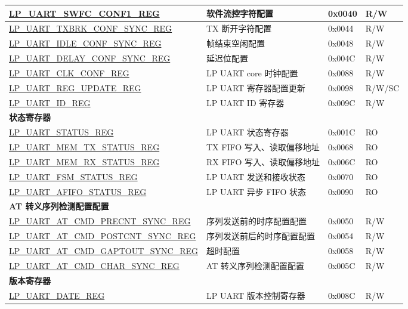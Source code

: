 \begin{longtable}{ | p{6.5cm} | p{7cm} | p{1.3cm} | p{1cm} | }
\hyperref[regdesc:LPUARTSWFCCONF1REG]{LP\_UART\_SWFC\_CONF1\_REG} & 软件流控字符配置 & 0x0040 & R/W \\ \hline
\hyperref[regdesc:LPUARTTXBRKCONFSYNCREG]{LP\_UART\_TXBRK\_CONF\_SYNC\_REG} & TX 断开字符配置 & 0x0044 & R/W \\ \hline
\hyperref[regdesc:LPUARTIDLECONFSYNCREG]{LP\_UART\_IDLE\_CONF\_SYNC\_REG} & 帧结束空闲配置 & 0x0048 & R/W \\ \hline
\hyperref[regdesc:LPUARTDELAYCONFSYNCREG]{LP\_UART\_DELAY\_CONF\_SYNC\_REG} & 延迟位配置 & 0x004C & R/W \\ \hline
\hyperref[regdesc:LPUARTCLKCONFREG]{LP\_UART\_CLK\_CONF\_REG} & LP UART core 时钟配置 & 0x0088 & R/W \\ \hline
\hyperref[regdesc:LPUARTREGUPDATEREG]{LP\_UART\_REG\_UPDATE\_REG} & LP UART 寄存器配置更新 & 0x0098 & R/W/SC \\ \hline
\hyperref[regdesc:LPUARTIDREG]{LP\_UART\_ID\_REG} & LP UART ID 寄存器 & 0x009C & R/W \\ \hline
\multicolumn{4}{|l|}{\textbf{状态寄存器}} \\ \hline
\hyperref[regdesc:LPUARTSTATUSREG]{LP\_UART\_STATUS\_REG} & LP UART 状态寄存器 & 0x001C & RO \\ \hline
\hyperref[regdesc:LPUARTMEMTXSTATUSREG]{LP\_UART\_MEM\_TX\_STATUS\_REG} & TX FIFO 写入、读取偏移地址 & 0x0068 & RO \\ \hline
\hyperref[regdesc:LPUARTMEMRXSTATUSREG]{LP\_UART\_MEM\_RX\_STATUS\_REG} & RX FIFO 写入、读取偏移地址 & 0x006C & RO \\ \hline
\hyperref[regdesc:LPUARTFSMSTATUSREG]{LP\_UART\_FSM\_STATUS\_REG} & LP UART 发送和接收状态 & 0x0070 & RO \\ \hline
\hyperref[regdesc:LPUARTAFIFOSTATUSREG]{LP\_UART\_AFIFO\_STATUS\_REG} & LP UART 异步 FIFO 状态 & 0x0090 & RO \\ \hline
\multicolumn{4}{|l|}{\textbf{AT 转义序列检测配置配置}} \\ \hline
\hyperref[regdesc:LPUARTATCMDPRECNTSYNCREG]{LP\_UART\_AT\_CMD\_PRECNT\_SYNC\_REG} & 序列发送前的时序配置配置 & 0x0050 & R/W \\ \hline
\hyperref[regdesc:LPUARTATCMDPOSTCNTSYNCREG]{LP\_UART\_AT\_CMD\_POSTCNT\_SYNC\_REG} & 序列发送前后的时序配置配置 & 0x0054 & R/W \\ \hline
\hyperref[regdesc:LPUARTATCMDGAPTOUTSYNCREG]{LP\_UART\_AT\_CMD\_GAPTOUT\_SYNC\_REG} & 超时配置 & 0x0058 & R/W \\ \hline
\hyperref[regdesc:LPUARTATCMDCHARSYNCREG]{LP\_UART\_AT\_CMD\_CHAR\_SYNC\_REG} & AT 转义序列检测配置配置 & 0x005C & R/W \\ \hline
\multicolumn{4}{|l|}{\textbf{版本寄存器}} \\ \hline
\hyperref[regdesc:LPUARTDATEREG]{LP\_UART\_DATE\_REG} & LP UART 版本控制寄存器 & 0x008C & R/W \\ \hline

\end{longtable}
